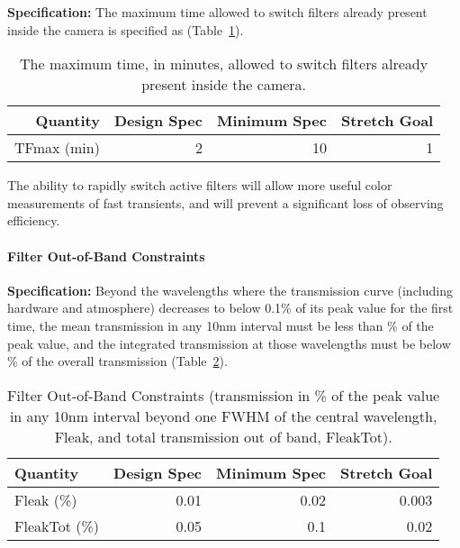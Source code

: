 {\bf Specification:} The maximum time allowed to switch filters already
present inside the camera is specified as
(Table~\ref{Tfilterswitch}).

\begin{table}[h]
\begin{tabular}{|r|r|r|r|}
\hline
     Quantity     & Design Spec & Minimum Spec  & Stretch Goal      \\
\hline
 TFmax (min)      &      2      &      10       &       1           \\
\hline
\end{tabular}
\caption{The maximum time, in minutes, allowed to switch filters already
present inside the camera.}
\label{Tfilterswitch}
\end{table}

The ability to rapidly switch active filters will allow more useful color
measurements of fast transients, and will prevent a significant loss of
observing efficiency.


\paragraph{Filter Out-of-Band Constraints\\}

{\bf Specification:} Beyond the wavelengths where the transmission curve
(including hardware and atmosphere) decreases to below 0.1\% of its peak value
for the first time, the mean transmission in any 10nm interval must be less than
\% of the peak value, and the integrated transmission at those wavelengths
must be below
\% of the overall transmission (Table~\ref{Tleaks}).

\begin{table}[h]
\begin{tabular}{|l|r|r|r|}
\hline
Quantity    & Design Spec & Minimum Spec & Stretch Goal        \\
\hline
 Fleak (\%)      &      0.01      &      0.02   &       0.003     \\
 FleakTot (\%)   &      0.05      &      0.1    &       0.02      \\
\hline
\end{tabular}
\caption{Filter Out-of-Band Constraints (transmission in \% of the peak
value in any 10nm interval beyond one FWHM of the central wavelength,
Fleak, and total transmission out of band, FleakTot).}
\label{Tleaks}
\end{table}

